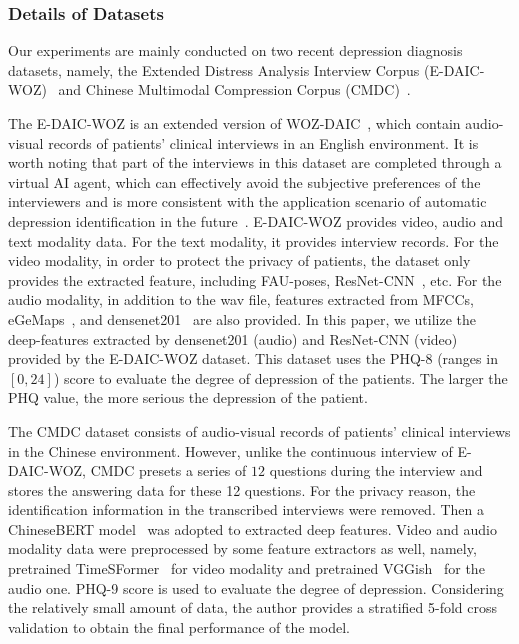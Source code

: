 \documentclass{article}
\begin{document}
\subsubsection{Details of Datasets}

Our experiments are mainly conducted on two recent depression diagnosis datasets, namely, the Extended Distress Analysis Interview Corpus (E-DAIC-WOZ)~\cite{AVEC2019,DAIC} and Chinese Multimodal Compression Corpus (CMDC)~\cite{CMDC}.

The E-DAIC-WOZ is an extended version of WOZ-DAIC~\cite{DAIC}, which contain audio-visual records of patients' clinical interviews in an English environment. It is worth noting that part of the interviews in this dataset are completed through a virtual AI agent, which can effectively avoid the subjective preferences of the interviewers and is more consistent with the application scenario of automatic depression identification in the future~\cite{DAIC}. E-DAIC-WOZ provides video, audio and text modality data. For the text modality, it provides interview records. For the video modality, in order to protect the privacy of patients, the dataset only provides the extracted feature, including FAU-poses, ResNet-CNN~\cite{resnet}, etc. For the audio modality, in addition to the wav file, features extracted from MFCCs, eGeMaps~\cite{eGeMaps}, and densenet201~\cite{densenet} are also provided. In this paper, we utilize the deep-features extracted by densenet201 (audio) and ResNet-CNN (video) provided by the E-DAIC-WOZ dataset. This dataset uses the PHQ-8 (ranges in $[0, 24]$) score to evaluate the degree of depression of the patients. The larger the PHQ value, the more serious the depression of the patient.

The CMDC dataset consists of audio-visual records of patients' clinical interviews in the Chinese environment. However, unlike the continuous interview of E-DAIC-WOZ, CMDC presets a series of $12$ questions during the interview and stores the answering data for these 12 questions. For the privacy reason, the identification information in the transcribed interviews were removed. Then a ChineseBERT model~\cite{CBert} was adopted to extracted deep features. Video and audio modality data were preprocessed by some feature extractors as well, namely, pretrained TimeSFormer~\cite{tfo} for video modality and pretrained VGGish~\cite{Y8} for the audio one.
PHQ-9 score is used to evaluate the degree of depression. Considering the relatively small amount of data, the author provides a stratified 5-fold cross validation to obtain the final performance of the model.
\end{document}
